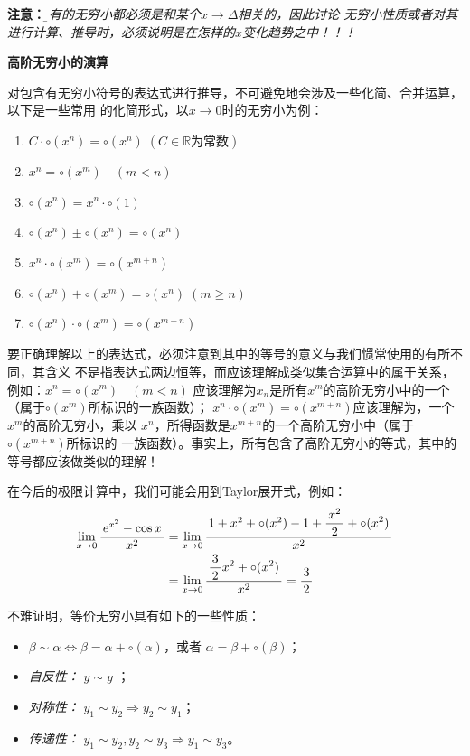 {\bf 注意：}{\it\b 所有的无穷小都必须是和某个$x\to\Delta$相关的，因此讨论
无穷小性质或者对其进行计算、推导时，必须说明是在怎样的$x$变化趋势之中！！！}

\begin{shaded}
	{\bf 高阶无穷小的演算}
	
	对包含有无穷小符号的表达式进行推导，不可避免地会涉及一些化简、合并运算，以下是一些常用
	的化简形式，以$x\to 0$时的无穷小为例：
	\begin{enumerate}[(1)]
  	  \setlength{\itemindent}{1cm}
  	  \item $C\cdot\circ(x^n)=\circ(x^n)\;(C\in\mathbb{R}\mbox{为常数})$
	  \item $x^n=\circ(x^m)\quad (m<n)$ 
	  \item $\circ(x^n)=x^n\cdot\circ(1)$
	  \item $\circ(x^n)\pm\circ(x^n)=\circ(x^n)$
	  \item $x^n\cdot\circ(x^m)=\circ(x^{m+n})$ 
	  \item $\circ(x^n)+\circ(x^m)=\circ(x^n)\;(m\geq n)$  
	  \item $\circ(x^n)\cdot\circ(x^m)=\circ(x^{m+n})$
	\end{enumerate}
	
	要正确理解以上的表达式，必须注意到其中的等号的意义与我们惯常使用的有所不同，其含义
	不是指表达式两边恒等，而应该理解成类似集合运算中的属于关系，例如：$x^n=\circ(x^m)\quad (m<n)$ 
	应该理解为$x_n$是所有$x^m$的高阶无穷小中的一个（属于$\circ(x^m)$所标识的一族函数）；
	$x^n\cdot\circ(x^m)=\circ(x^{m+n})$应该理解为，一个$x^m$的高阶无穷小，乘以
	$x^n$，所得函数是$x^{m+n}$的一个高阶无穷小中（属于$\circ(x^{m+n})$所标识的
	一族函数）。事实上，所有包含了高阶无穷小的等式，其中的等号都应该做类似的理解！
	
	在今后的极限计算中，我们可能会用到Taylor展开式，例如：
	\begin{align}
		\lim\limits_{x\to{0}}\displaystyle\frac{\,{e^{x^2}-\cos x}\,}{\,{x^2}\,}&=\lim\limits_{x\to{0}}
		\displaystyle\frac{\,{1+x^2+\circ(x^2)-1+\displaystyle\frac{\,{x^2}\,}{\,{2}\,}+\circ(x^2)}\,}{\,{x^2}\,}\notag\\
		&=\lim\limits_{x\to{0}}\displaystyle\frac{\,{\displaystyle\frac{\,{3}\,}{\,{2}\,}x^2+\circ(x^2)}\,}{\,{x^2}\,}=\displaystyle\frac{\,{3}\,}{\,{2}\,}\notag
	\end{align}
\end{shaded}


不难证明，等价无穷小具有如下的一些性质：
\begin{itemize}
  \setlength{\itemindent}{1cm}
  \item $\beta\sim\alpha\Leftrightarrow\beta=\alpha+\circ(\alpha)$，或者
	$\alpha=\beta+\circ(\beta)$；
  \item {\it 自反性：} $y\sim y$ ；
  \item {\it 对称性：} $y_1\sim y_2\Rightarrow y_2\sim y_1$； 
  \item {\it 传递性：} $y_1\sim y_2,y_2\sim y_3\Rightarrow y_1\sim y_3$。 
\end{itemize}


